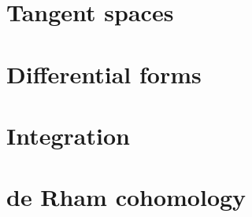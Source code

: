 \documentclass{report}
\begin{document}
\chapter{Tangent spaces}



\chapter{Differential forms}


\chapter{Integration}




\chapter{de Rham cohomology}

\end{document}
